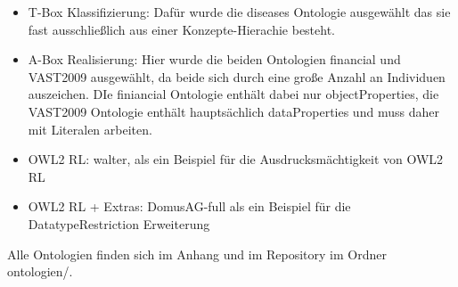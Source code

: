 \begin{itemize}
  \item T-Box Klassifizierung: Dafür wurde die diseases Ontologie ausgewählt das sie fast ausschließlich aus einer Konzepte-Hierachie besteht.
  \item A-Box Realisierung: Hier wurde die beiden Ontologien financial und VAST2009 ausgewählt, da beide sich durch eine große Anzahl an Individuen auszeichen. DIe finiancial Ontologie enthält dabei nur objectProperties, die VAST2009 Ontologie enthält hauptsächlich dataProperties und muss daher mit Literalen arbeiten.
  \item OWL2 RL: walter, als ein Beispiel für die Ausdrucksmächtigkeit von OWL2 RL
  \item OWL2 RL + Extras: DomusAG-full als ein Beispiel für die DatatypeRestriction Erweiterung
\end{itemize}

Alle Ontologien finden sich im Anhang und im Repository im Ordner ontologien/.
